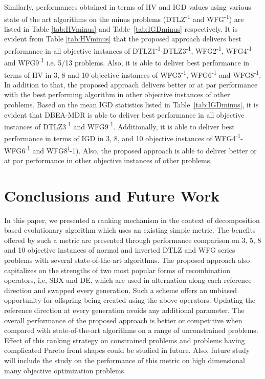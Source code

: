 \documentclass{sig-alternate}
\begin{document}
Similarly, performances obtained in terms of HV and IGD values using various state of the art algorithms on the minus problems (DTLZ\textsuperscript{-1} and WFG\textsuperscript{-1}) are listed in Table \ref{tab:HVminus} and Table~\ref{tab:IGDminus} respectively. It is evident from Table \ref{tab:HVminus} that the proposed approach delivers best performance in all objective instances of DTLZ1\textsuperscript{-1}-DTLZ3\textsuperscript{-1}, WFG2\textsuperscript{-1}, WFG4\textsuperscript{-1} and WFG9\textsuperscript{-1} i.e. 5/13 problems. Also, it is able to deliver best performance in terms of HV in 3, 8 and 10 objective instances of WFG5\textsuperscript{-1}, WFG6\textsuperscript{-1} and WFG8\textsuperscript{-1}. In addition to that, the proposed approach delivers better or at par performance with the best performing algorithm in other objective instances of other problems. Based on the mean IGD statistics listed in Table~\ref{tab:IGDminus}, it is evident that DBEA-MDR is able to deliver best performance in all objective instances of DTLZ3\textsuperscript{-1} and WFG9\textsuperscript{-1}. Additionally, it is able to deliver best performance in terms of IGD in 3, 8, and 10 objective instances of WFG4\textsuperscript{-1}-WFG6\textsuperscript{-1} and WFG8\textsuperscript(-1). Also, the proposed approach is able to deliver better or at par performance in other objective instances of other problems.

\section{Conclusions and Future Work}
\label{sec:conc}
In this paper, we presented a ranking mechanism in the context of decomposition based evolutionary algorithm which uses an existing simple metric. The benefits offered by such a metric are presented through performance comparison on 3, 5, 8 and 10 objective instances of normal and inverted DTLZ and WFG series problems with several state-of-the-art algorithms. The proposed approach also capitalizes on the strengths of two most popular forms of recombination operators, i,e, SBX and DE, which are used in alternation along each reference direction and swapped every generation. Such a scheme offers an unbiased opportunity for offspring being created using the above operators. Updating the reference direction at every generation avoids any additional parameter. The overall performance of the proposed approach is better or competitive when compared with state-of-the-art algorithms on a range of unconstrained problems. Effect of this ranking strategy on constrained problems and problems having complicated Pareto front shapes could be studied in future. Also, future study will include the study on the performance of this metric on high dimensional many objective optimization problems.


\small{}
\balance
\end{document}
